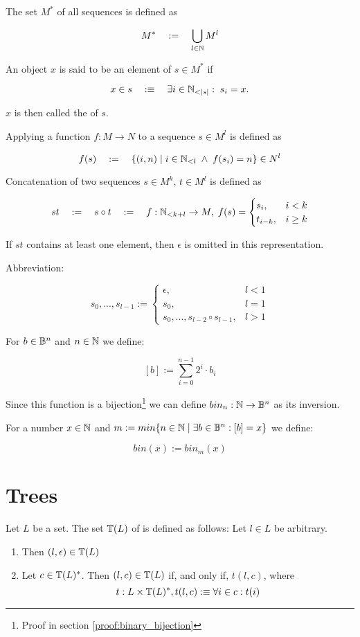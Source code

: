 The set $M^\ast$ of all sequences is defined as

\[  M^\ast \quad := \quad \bigcup_{l \in \mathbb{N}}  M^l\]

An object $x$ is said to be an element of $s \in M^\ast$ if 

\[ x \in s \quad : \equiv \quad \exists i \in \mathbb{N}_{<\vert s \vert} : \; s_i = x.\] 

$x$ is then called the  of $s$.

Applying a function $f: M \rightarrow N$ to a sequence $s \in M^l$ is defined as

\[f(s) \quad := \quad \lbrace (i, n) \mid i \in \mathbb{N}_{<l} \; \wedge \; f(s_i) = n\rbrace \in N^l\] 

Concatenation of two sequences $ s \in M^k$, $ t \in M^l$ is defined as

\[ s t \quad := \quad s \circ t \quad := \quad f: \mathbb{N}_{< k+l} \rightarrow M, \;f(s)=
\begin{cases}
s_i , & i<k \\
t_{i-k}, & i \geq k
\end{cases}
\]

If $s t$ contains at least one element, then $\epsilon$ is omitted in this representation.

Abbreviation:

\[ s_0 , ... , s_{l-1} :=
\begin{cases}
   \epsilon, & l< 1 \\
   s_0 , & l = 1 \\
   s_ 0 , ... , s_{l-2} \circ s_{l-1}, & l > 1
\end{cases}
\] 

For $b \in \mathbb{B}^n$ and $n \in \mathbb{N}$ we define:

\[[b] := \sum\limits_{i = 0}^{n-1} 2^i \cdot b_i \]

Since this function is a bijection\footnote{Proof in section  \ref{proof:binary_bijection}} we can define $bin_n : \mathbb{N} \rightarrow \mathbb{B}^n$ as its inversion.

For a number $x \in \mathbb{N}$ and $m := min\{n \in \mathbb{N} \mid \exists b \in \mathbb{B}^n : [b] = x \} $ we define: 

	\[bin(x) := bin_m(x)\]

\section{Trees}

Let $L$ be a set. The set $\mathbb{T}(L)$ of  is defined as follows:
Let $l \in L$ be arbitrary.
\begin{enumerate}
\item Then $(l, \epsilon) \in \mathbb{T}(L)$
\item Let $c \in \mathbb{T}(L)^\ast$. Then $(l, c) \in \mathbb{T}(L)$ if, and only if, $t(l, c)$, where
\[t : L \times \mathbb{T}(L)^\ast, t(l, c) : \equiv \forall i \in c : t(i)\]
\end{enumerate}


